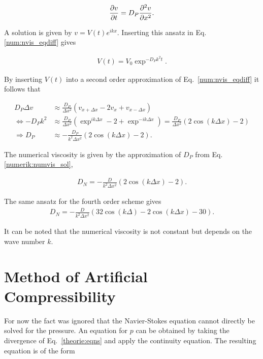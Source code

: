 \begin{align}
    \label{num:nvis_eqdiff}
    \pdn[v]{t} = D_P\pdn[^2v]{x^2}.
\end{align}

A solution is given by $v = V(t)e^{ikx}$. Inserting this ansatz in Eq. \ref{num:nvis_eqdiff} gives

\begin{align}
    V(t) = V_0 \exp^{-D_Pk^2t}.
\end{align}

By inserting $V(t)$ into a  second order approximation of Eq.~\ref{num:nvis_eqdiff} it follows that

\begin{align}
                      D_P \Delta v  &\approx \frac{D_P}{\Delta x^2} \left(v_{x+\Delta x} - 2 v_x + v_{x - \Delta x}\right) \\
    \Leftrightarrow   -D_P k^2        &\approx \frac{D_P}{\Delta x^2} \left(\exp^{ik\Delta x} - 2 + \exp^{-ik\Delta x}\right) =   \frac{D_P}{\Delta x^2} \left(2\cos(k\Delta x) - 2\right)\\
    \Rightarrow   D_P      &\approx - \frac{D_P}{k^2 \Delta x^2} \left(2\cos(k\Delta x) - 2\right).
    \label{numerik:numvis_sol}
\end{align}

The numerical viscosity is given by the approximation of $D_P$  from Eq. \ref{numerik:numvis_sol},

\begin{align}
 \label{NUMERIC:NUMVIS}
    D_N = -\frac{D}{k^2 \Delta x^2} \left(2\cos(k\Delta x) - 2\right).
\end{align}

The same ansatz for the fourth order scheme gives
\begin{align}
 \label{NUMERIC:NUMVIS2}
    D_N = -\frac{D}{k^2 \Delta x^2} \left(32\cos(k\Delta ) - 2\cos(k\Delta x) - 30\right).
\end{align}

It can be noted that the numerical viscosity is not constant but depends on the wave number $k$.
\clearpage


\section{Method of Artificial Compressibility}
\label{num:sec_articomp}

For now the fact was ignored that the Navier-Stokes equation cannot directly be solved for the pressure.
An equation for $p$ can be obtained by taking the divergence of Eq.~\ref{theorie:eqns} and apply the continuity equation.
The resulting equation is of the form \citep{Lulff2011}

